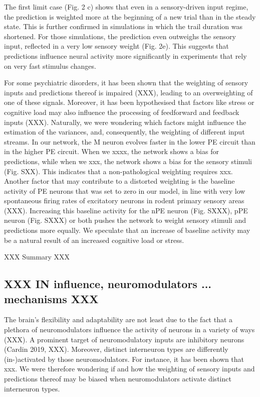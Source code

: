 \documentclass[10pt,a4paper,draft]{article}
\begin{document}
The first limit case (Fig. 2 c) shows that even in a sensory-driven input regime, the prediction is weighted more at the beginning of a new trial than in the steady state. This is further confirmed in simulations in which the trail duration was shortened. For those simulations, the prediction even outweighs the sensory input, reflected in a very low sensory weight (Fig. 2e). This suggests that predictions influence neural activity more significantly in experiments that rely on very fast stimulus changes. 

For some psychiatric disorders, it has been shown that the weighting of sensory inputs and predictions thereof is impaired (XXX), leading to an overweighting of one of these signals. Moreover, it has been hypothesised that factors like stress or cognitive load may also influence the processing of feedforward and feedback inputs (XXX).  Naturally, we were wondering which factors might influence the estimation of the variances, and, consequently, the weighting of different input streams. In our network, the M neuron evolves faster in the lower PE circuit than in the higher PE circuit. When we xxxx, the network shows a bias for predictions, while when we xxx, the network shows a bias for the sensory stimuli (Fig. SXX). This indicates that a non-pathological weighting requires xxx. Another factor that may contribute to a distorted weighting is the baseline activity of PE neurons that was set to zero in our model, in line with very low spontaneous firing rates of excitatory neurons in rodent primary sensory areas (XXX). Increasing this baseline activity for the nPE neuron (Fig. SXXX), pPE neuron (Fig. SXXX) or both pushes the network to weight sensory stimuli and predictions more equally. We speculate that an increase of baseline activity may be a natural result of an increased cognitive load or stress. 

XXX Summary XXX


\subsection*{XXX IN influence, neuromodulators ... mechanisms XXX}
%
The brain's flexibility and adaptability are not least due to the fact that a plethora of neuromodulators influence the activity of neurons in a variety of ways (XXX). A prominent target of neuromodulatory inputs are inhibitory neurons (Cardin 2019, XXX). Moreover, distinct interneuron types are differently (in-)activated by those neuromodulators. For instance, it has been shown that xxx. We were therefore wondering if and how the weighting of sensory inputs and predictions thereof may be biased when neuromodulators activate distinct interneuron types.
\end{document}

